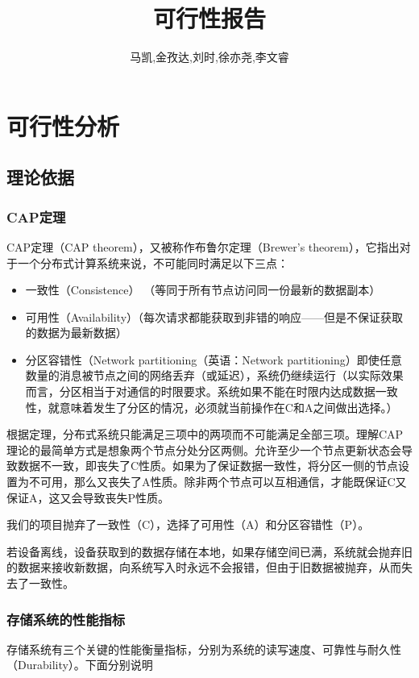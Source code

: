 \documentclass{ctexart}
\begin{document}
\title{可行性报告}
\author{马凯,金孜达,刘时,徐亦尧,李文睿}
\maketitle
\tableofcontents
\newpage

\section{可行性分析}
\subsection{理论依据}
\subsubsection{CAP定理}
CAP定理（CAP theorem），又被称作布鲁尔定理（Brewer's theorem），它指出对于一个分布式计算系统来说，不可能同时满足以下三点：
\begin{itemize}
    \item 一致性（Consistence） （等同于所有节点访问同一份最新的数据副本）
    \item 可用性（Availability）（每次请求都能获取到非错的响应——但是不保证获取的数据为最新数据）
    \item 分区容错性（Network partitioning（英语：Network partitioning）即使任意数量的消息被节点之间的网络丢弃（或延迟），系统仍继续运行（以实际效果而言，分区相当于对通信的时限要求。系统如果不能在时限内达成数据一致性，就意味着发生了分区的情况，必须就当前操作在C和A之间做出选择。）
\end{itemize}

根据定理，分布式系统只能满足三项中的两项而不可能满足全部三项。理解CAP理论的最简单方式是想象两个节点分处分区两侧。允许至少一个节点更新状态会导致数据不一致，即丧失了C性质。如果为了保证数据一致性，将分区一侧的节点设置为不可用，那么又丧失了A性质。除非两个节点可以互相通信，才能既保证C又保证A，这又会导致丧失P性质。

我们的项目抛弃了一致性（C），选择了可用性（A）和分区容错性（P）。

若设备离线，设备获取到的数据存储在本地，如果存储空间已满，系统就会抛弃旧的数据来接收新数据，向系统写入时永远不会报错，但由于旧数据被抛弃，从而失去了一致性。

\subsubsection{存储系统的性能指标}

存储系统有三个关键的性能衡量指标，分别为系统的读写速度、可靠性与耐久性（Durability）。下面分别说明
\end{document}
